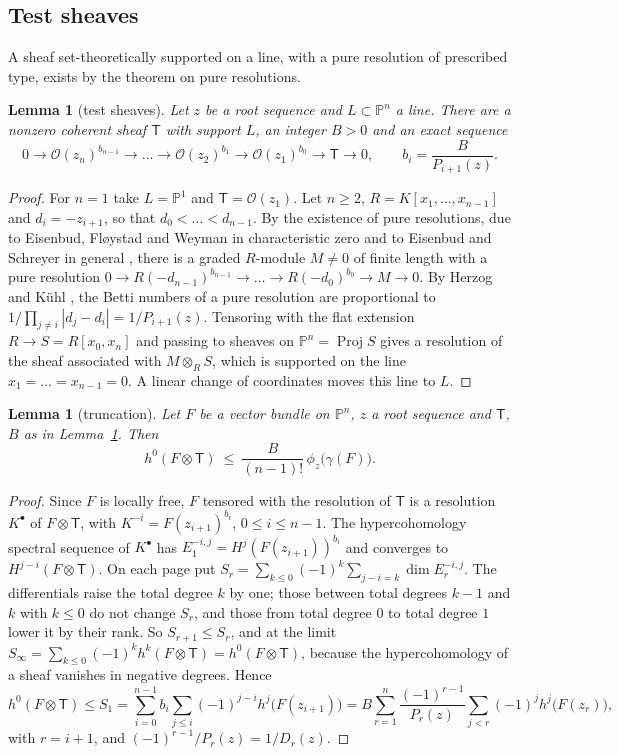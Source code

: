 \documentclass[11pt]{amsart}
\newtheorem{lemma}[theorem]{Lemma}
\theoremstyle{definition}
\theoremstyle{remark}
\newcommand{\PP}{\mathbb{P}}
\newcommand{\OO}{\mathcal{O}}
\newcommand{\Tt}{\mathsf{T}}
\begin{document}
\subsection{Test sheaves}
A sheaf set-theoretically supported on a line, with a pure resolution of prescribed type, exists by the theorem on pure resolutions.

\begin{lemma}[test sheaves]\label{lem:testsheaf}
Let $z$ be a root sequence and $L\subset\PP^n$ a line. There are a nonzero coherent sheaf $\Tt$ with support $L$, an integer $B>0$ and an exact sequence
\[
0\to\OO(z_n)^{b_{n-1}}\to\dots\to\OO(z_2)^{b_1}\to\OO(z_1)^{b_0}\to \Tt\to0,\qquad b_i=\frac B{P_{i+1}(z)} .
\]
\end{lemma}

\begin{proof}
For $n=1$ take $L=\PP^1$ and $\Tt=\OO(z_1)$. Let $n\ge2$, $R=K[x_1,\dots,x_{n-1}]$ and $d_i=-z_{i+1}$, so that $d_0<\dots<d_{n-1}$. By the existence of pure resolutions, due to Eisenbud, Fløystad and Weyman in characteristic zero \cite{EFW11} and to Eisenbud and Schreyer in general \cite[Thm.~5.1]{ES09}, there is a graded $R$-module $M\ne0$ of finite length with a pure resolution $0\to R(-d_{n-1})^{b_{n-1}}\to\dots\to R(-d_0)^{b_0}\to M\to0$. By Herzog and Kühl \cite{HK84}, the Betti numbers of a pure resolution are proportional to $1/\prod_{j\ne i}|d_j-d_i|=1/P_{i+1}(z)$. Tensoring with the flat extension $R\to S=R[x_0,x_n]$ and passing to sheaves on $\PP^n=\operatorname{Proj}S$ gives a resolution of the sheaf associated with $M\otimes_RS$, which is supported on the line $x_1=\dots=x_{n-1}=0$. A linear change of coordinates moves this line to $L$.
\end{proof}

\begin{lemma}[truncation]\label{lem:truncation}
Let $F$ be a vector bundle on $\PP^n$, $z$ a root sequence and $\Tt$, $B$ as in Lemma~\textup{\ref{lem:testsheaf}}. Then
\[
h^0(F\otimes \Tt)\ \le\ \frac B{(n-1)!}\,\phi_z\big(\gamma(F)\big).
\]
\end{lemma}

\begin{proof}
Since $F$ is locally free, $F$ tensored with the resolution of $\Tt$ is a resolution $K^\bullet$ of $F\otimes \Tt$, with $K^{-i}=F(z_{i+1})^{b_i}$, $0\le i\le n-1$. The hypercohomology spectral sequence of $K^\bullet$ has $E_1^{-i,j}=H^j(F(z_{i+1}))^{b_i}$ and converges to $H^{j-i}(F\otimes \Tt)$. On each page put $S_r=\sum_{k\le0}(-1)^k\sum_{j-i=k}\dim E_r^{-i,j}$. The differentials raise the total degree $k$ by one; those between total degrees $k-1$ and $k$ with $k\le0$ do not change $S_r$, and those from total degree $0$ to total degree $1$ lower it by their rank. So $S_{r+1}\le S_r$, and at the limit $S_\infty=\sum_{k\le0}(-1)^kh^k(F\otimes \Tt)=h^0(F\otimes \Tt)$, because the hypercohomology of a sheaf vanishes in negative degrees. Hence
\[
h^0(F\otimes \Tt)\le S_1=\sum_{i=0}^{n-1}b_i\sum_{j\le i}(-1)^{j-i}h^j\big(F(z_{i+1})\big)=B\sum_{r=1}^n\frac{(-1)^{r-1}}{P_r(z)}\sum_{j<r}(-1)^jh^j\big(F(z_r)\big),
\]
with $r=i+1$, and $(-1)^{r-1}/P_r(z)=1/D_r(z)$.
\end{proof}
\end{document}
